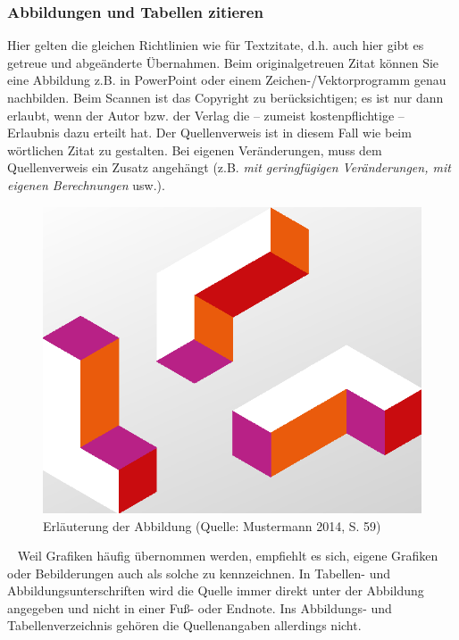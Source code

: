 \documentclass[a4paper,11pt]{article}%
\renewcommand{\\}{\vspace*{0.5\baselineskip} \newline}
\begin{document}
\subsubsection{Abbildungen und Tabellen zitieren}
Hier gelten die gleichen Richtlinien wie für Textzitate, d.h. auch hier gibt es getreue und abgeänderte Übernahmen. Beim originalgetreuen Zitat können Sie eine Abbildung z.B. in PowerPoint oder einem Zeichen-/Vektorprogramm genau nachbilden. Beim Scannen ist das Copyright zu berücksichtigen; es ist nur dann erlaubt, wenn der Autor bzw. der Verlag die – zumeist kostenpflichtige – Erlaubnis dazu erteilt hat. Der Quellenverweis ist in diesem Fall wie beim wörtlichen Zitat zu gestalten. Bei eigenen Veränderungen, muss dem Quellenverweis ein Zusatz angehängt (z.B. \textit{mit geringfügigen Veränderungen, mit eigenen Berechnungen} usw.).
\begin{figure}[h]
	\includegraphics[scale=0.25]{Grafiken/Abbildung2.png}\\
	\caption[Abbildung 2]{Erläuterung der Abbildung (Quelle: Mustermann 2014, S. 59)}
\end{figure}
~\newline
Weil Grafiken häufig übernommen werden, empfiehlt es sich, eigene Grafiken oder Bebilderungen auch als solche zu kennzeichnen.\newline
In Tabellen- und Abbildungsunterschriften wird die Quelle immer direkt unter der Abbildung angegeben und nicht in einer Fuß- oder Endnote. Ins Abbildungs- und Tabellenverzeichnis gehören die Quellenangaben allerdings nicht.
\end{document}
